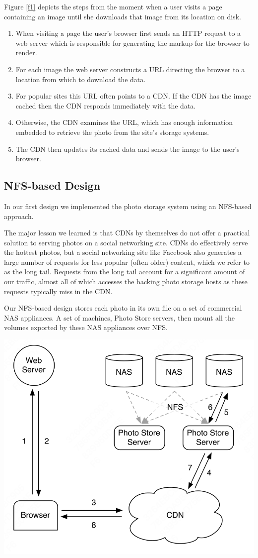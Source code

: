 \documentclass[11pt]{article}
\begin{document}
Figure \ref{f1} depicts the steps from the moment when a user visits a page containing an image until
she downloads that image from its location on disk.
\begin{enumerate}
\item When visiting a page the user’s browser first sends an HTTP request to a web server which is
responsible for generating the markup for the browser to render.
\item For each image the web server constructs a URL directing the browser to a location from which to
download the data.
\item For popular sites this URL often points to a CDN. If the CDN has the image cached then the CDN
responds immediately with the data.
\item Otherwise, the CDN examines the URL, which has enough information embedded to retrieve the photo
from the site’s storage systems.
\item The CDN then updates its cached data and sends the image to the user’s browser.
\end{enumerate}
\subsection{NFS-based Design}
\label{sec:org8322bf4}
In our first design we implemented the photo storage system using an NFS-based approach.

The major lesson we learned is that CDNs by themselves do not offer a practical solution to serving
photos on a social networking site. CDNs do effectively serve the hottest photos, but a social
networking site like Facebook also generates a large number of requests for less popular (often older)
content, which we refer to as the long tail. Requests from the long tail account for a significant
amount of our traffic, almost all of which accesses the backing photo storage hosts as these requests
typically miss in the CDN.

Our NFS-based design stores each photo in its own file on a set of commercial NAS appliances. A set of
machines, Photo Store servers, then mount all the volumes exported by these NAS appliances over NFS.

\begin{center}
\includegraphics[width=.8\textwidth]{../../images/papers/133.png}
\end{center}
\end{document}
